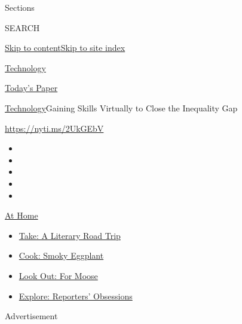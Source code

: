 Sections

SEARCH

\protect\hyperlink{site-content}{Skip to
content}\protect\hyperlink{site-index}{Skip to site index}

\href{https://www.nytimes.com/section/technology}{Technology}

\href{https://myaccount.nytimes.com/auth/login?response_type=cookie\&client_id=vi}{}

\href{https://www.nytimes.com/section/todayspaper}{Today's Paper}

\href{/section/technology}{Technology}\textbar{}Gaining Skills Virtually
to Close the Inequality Gap

\url{https://nyti.ms/2UkGEbV}

\begin{itemize}
\item
\item
\item
\item
\item
\end{itemize}

\href{https://www.nytimes.com/spotlight/at-home?action=click\&pgtype=Article\&state=default\&region=TOP_BANNER\&context=at_home_menu}{At
Home}

\begin{itemize}
\tightlist
\item
  \href{https://www.nytimes.com/2020/07/28/books/time-for-a-literary-road-trip.html?action=click\&pgtype=Article\&state=default\&region=TOP_BANNER\&context=at_home_menu}{Take:
  A Literary Road Trip}
\item
  \href{https://www.nytimes.com/2020/07/29/magazine/bored-with-your-home-cooking-some-smoky-eggplant-will-fix-that.html?action=click\&pgtype=Article\&state=default\&region=TOP_BANNER\&context=at_home_menu}{Cook:
  Smoky Eggplant}
\item
  \href{https://www.nytimes.com/2020/07/27/travel/moose-michigan-isle-royale.html?action=click\&pgtype=Article\&state=default\&region=TOP_BANNER\&context=at_home_menu}{Look
  Out: For Moose}
\item
  \href{https://www.nytimes.com/interactive/2020/at-home/even-more-reporters-editors-diaries-lists-recommendations.html?action=click\&pgtype=Article\&state=default\&region=TOP_BANNER\&context=at_home_menu}{Explore:
  Reporters' Obsessions}
\end{itemize}

Advertisement

